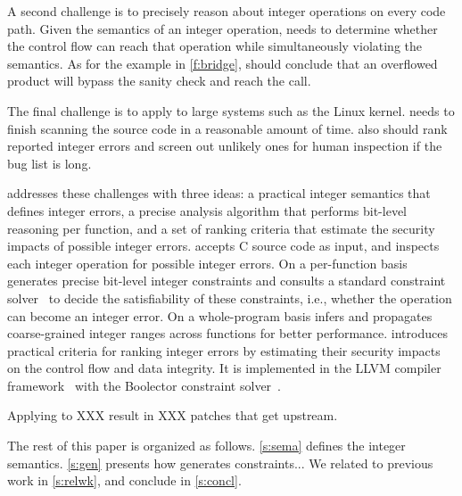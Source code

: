 A second challenge is to precisely reason about integer operations
on every code path.  Given the semantics of an integer operation,
\sys needs to determine whether the control flow can reach that
operation while simultaneously violating the semantics.  As for the
example in \autoref{f:bridge}, \sys should conclude that an overflowed
product  will bypass the sanity check and reach the
 call.

The final challenge is to apply \sys to large systems such as the
Linux kernel.  \sys needs to finish scanning the source code in a
reasonable amount of time.  \sys also should rank reported integer
errors and screen out unlikely ones for human inspection if the bug
list is long.

\sys addresses these challenges with three ideas: a practical integer
semantics that defines integer errors, a precise analysis algorithm
that performs bit-level reasoning per function, and a set of ranking
criteria that estimate the security impacts of possible integer
errors.  \sys accepts C source code as input, and inspects each
integer operation for possible integer errors.
%
On a per-function basis \sys generates precise bit-level integer
constraints and consults a standard constraint
solver~\cite{boolector} to decide the satisfiability
of these constraints, i.e., whether the operation can become an
integer error. 
%
On a whole-program basis \sys infers and propagates coarse-grained
integer ranges across functions for better performance.
%
\sys introduces practical criteria for ranking integer
errors by estimating their security impacts on the control flow and
data integrity.
\fi
%
It is implemented in the LLVM compiler framework~\cite{lattner:llvm}
with the Boolector constraint solver~\cite{boolector}.

Applying \sys to XXX result in XXX patches that get upstream.


The rest of this paper is organized as follows. \autoref{s:sema}
defines the integer semantics.  \autoref{s:gen} presents how \sys generates
constraints...  We related \sys to previous work in \autoref{s:relwk},
and conclude in \autoref{s:concl}.
